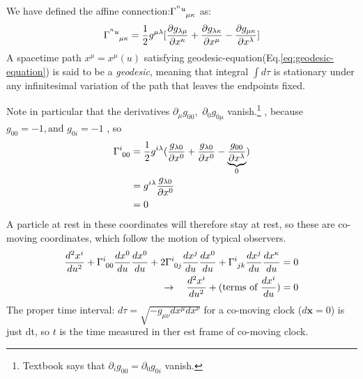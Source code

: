 \documentclass[11pt,a4paper,dvipdfmx]{jsarticle}
\theoremstyle{plain}
\theoremstyle{break}
\newcommand{\mbx}{\mathbf{x}}
\newcommand{\tensorGamma}[1]{\tensor{\Gamma}{ #1}}
\newcommand{\tensorg}[1]{\tensor{g}{ #1}}
\begin{document}
We have defined the affine connection:$\tensorGamma{^{^nu}_{\mu \kappa}}$ as:
\begin{align}
  \tensorGamma{^{^nu}_{\mu \kappa}} = \frac{1}{2}g^{\mu \lambda}[ \frac{\partial g_{\lambda \mu}}{\partial x^{\kappa}} + \frac{\partial g_{\lambda \kappa}}{\partial x^\mu} - \frac{\partial g_{\mu \kappa}}{\partial x^\lambda}] \label{eq:christoffel-symbols}
\end{align}
A spacetime path $x^\mu = x^\mu(u)$ satisfying geodesic-equation(Eq.\eqref{eq:geodesic-equation}) is said to be a \textit{geodesic}, meaning that integral $\int d\tau$ is stationary under any infinitesimal variation of the path that leaves the endpoints fixed.

Note in particular that the derivatives $\partial_\mu g_{00},\,\, \partial_0 g_{0\mu}$ vanish.\footnote{%
Textbook says that $\partial_i g_{00}= \partial_0 g_{0i}$ vanish. }%
, because $g_{00}=-1, \text{and} \,\, g_{0i}=-1$ , so
\begin{align}
  \tensorGamma{^i_{00}}
  &= \frac{1}{2}g^{i\lambda}(\frac{g_{\lambda 0}}{\partial x^0}+\frac{g_{\lambda 0}}{\partial x^0} - \underbrace{\frac{g_{00}}{\partial x^\lambda}}_{0}) \\
  &=\tensorg{^{i \lambda}}\frac{g_{\lambda 0}}{\partial x^0} \\
  &= 0
\end{align}
A particle at rest in these coordinates will therefore stay at rest, so these are co-moving coordinates, which follow the motion of typical observers.
\begin{align}
  \frac{d^2 x^{i}}{du^{2}} + \tensorGamma{^i_{00}}\frac{dx^0}{du}\frac{dx^0}{du}
  + 2 \tensorGamma{^i_{0j}}\frac{dx^j}{du}\frac{dx^0}{du}
  + \tensorGamma{^i_{jk}}\frac{dx^j}{du}\frac{dx^\kappa}{du} &= 0\\
  \rightarrow \quad \frac{d^2 x^{i}}{du^{2}} +( \text{terms of } \frac{dx^i}{du}) &=0
\end{align}
 The proper time interval: $d\tau = \sqrt{-g_{\mu\nu}dx^\mu dx^\nu}$ for a co-moving clock ($d\mbx=0$) is just dt, so $t$ is the time measured in ther est frame of co-moving clock.
\end{document}
